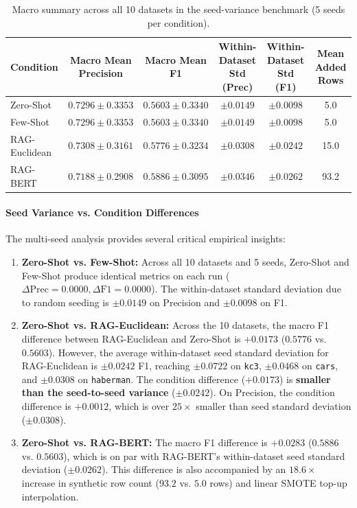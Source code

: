 \documentclass[sn-basic]{sn-jnl}
\begin{document}
\begin{table}[t]
\centering
\caption{Macro summary across all 10 datasets in the seed-variance benchmark (5 seeds per condition).}
\label{tab:seed_noise_macro}
\begin{tabular}{lccccc}
\toprule
\textbf{Condition} & \textbf{Macro Mean Precision} & \textbf{Macro Mean F1} & \textbf{Within-Dataset Std (Prec)} & \textbf{Within-Dataset Std (F1)} & \textbf{Mean Added Rows} \\
\midrule
Zero-Shot & $0.7296 \pm 0.3353$ & $0.5603 \pm 0.3340$ & $\pm 0.0149$ & $\pm 0.0098$ & 5.0 \\
Few-Shot & $0.7296 \pm 0.3353$ & $0.5603 \pm 0.3340$ & $\pm 0.0149$ & $\pm 0.0098$ & 5.0 \\
RAG-Euclidean & $0.7308 \pm 0.3161$ & $0.5776 \pm 0.3234$ & $\pm 0.0308$ & $\pm 0.0242$ & 15.0 \\
RAG-BERT & $0.7188 \pm 0.2908$ & $0.5886 \pm 0.3095$ & $\pm 0.0346$ & $\pm 0.0262$ & 93.2 \\
\bottomrule
\end{tabular}
\end{table}

\paragraph{Seed Variance vs. Condition Differences}
The multi-seed analysis provides several critical empirical insights:
\begin{enumerate}
    \item \textbf{Zero-Shot vs. Few-Shot:} Across all 10 datasets and 5 seeds, Zero-Shot and Few-Shot produce identical metrics on each run ($\Delta \text{Prec} = 0.0000, \Delta \text{F1} = 0.0000$). The within-dataset standard deviation due to random seeding is $\pm 0.0149$ on Precision and $\pm 0.0098$ on F1.
    \item \textbf{Zero-Shot vs. RAG-Euclidean:} Across the 10 datasets, the macro F1 difference between RAG-Euclidean and Zero-Shot is $+0.0173$ ($0.5776$ vs. $0.5603$). However, the average within-dataset seed standard deviation for RAG-Euclidean is $\pm 0.0242$ F1, reaching $\pm 0.0722$ on \texttt{kc3}, $\pm 0.0468$ on \texttt{cars}, and $\pm 0.0308$ on \texttt{haberman}. The condition difference ($+0.0173$) is \textbf{smaller than the seed-to-seed variance} ($\pm 0.0242$). On Precision, the condition difference is $+0.0012$, which is over $25\times$ smaller than seed standard deviation ($\pm 0.0308$).
    \item \textbf{Zero-Shot vs. RAG-BERT:} The macro F1 difference is $+0.0283$ ($0.5886$ vs. $0.5603$), which is on par with RAG-BERT's within-dataset seed standard deviation ($\pm 0.0262$). This difference is also accompanied by an $18.6\times$ increase in synthetic row count ($93.2$ vs. $5.0$ rows) and linear SMOTE top-up interpolation.
\end{enumerate}
\end{document}
